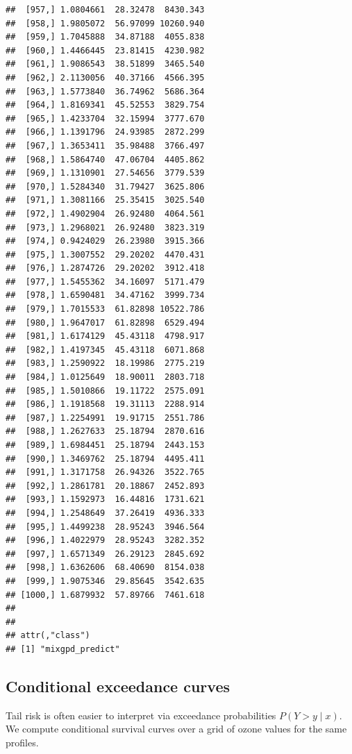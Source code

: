 \documentclass[article]{jss}\usepackage[]{graphicx}\usepackage[]{xcolor}
\makeatletter
\newenvironment{kframe}{%
 \def\at@end@of@kframe{}%
 \ifinner\ifhmode%
  \def\at@end@of@kframe{\end{minipage}}%
  \begin{minipage}{\columnwidth}%
 \fi\fi%
 \def\FrameCommand##1{\hskip\@totalleftmargin \hskip-\fboxsep
 \colorbox{shadecolor}{##1}\hskip-\fboxsep
     \hskip-\linewidth \hskip-\@totalleftmargin \hskip\columnwidth}%
 \MakeFramed {\advance\hsize-\width
   \@totalleftmargin\z@ \linewidth\hsize
   \@setminipage}}%
 {\par\unskip\endMakeFramed%
 \at@end@of@kframe}
\newenvironment{knitrout}{}{} %
\makeatother
\begin{document}
\begin{knitrout}
\begin{kframe}
\begin{verbatim}
##  [957,] 1.0804661  28.32478  8430.343
##  [958,] 1.9805072  56.97099 10260.940
##  [959,] 1.7045888  34.87188  4055.838
##  [960,] 1.4466445  23.81415  4230.982
##  [961,] 1.9086543  38.51899  3465.540
##  [962,] 2.1130056  40.37166  4566.395
##  [963,] 1.5773840  36.74962  5686.364
##  [964,] 1.8169341  45.52553  3829.754
##  [965,] 1.4233704  32.15994  3777.670
##  [966,] 1.1391796  24.93985  2872.299
##  [967,] 1.3653411  35.98488  3766.497
##  [968,] 1.5864740  47.06704  4405.862
##  [969,] 1.1310901  27.54656  3779.539
##  [970,] 1.5284340  31.79427  3625.806
##  [971,] 1.3081166  25.35415  3025.540
##  [972,] 1.4902904  26.92480  4064.561
##  [973,] 1.2968021  26.92480  3823.319
##  [974,] 0.9424029  26.23980  3915.366
##  [975,] 1.3007552  29.20202  4470.431
##  [976,] 1.2874726  29.20202  3912.418
##  [977,] 1.5455362  34.16097  5171.479
##  [978,] 1.6590481  34.47162  3999.734
##  [979,] 1.7015533  61.82898 10522.786
##  [980,] 1.9647017  61.82898  6529.494
##  [981,] 1.6174129  45.43118  4798.917
##  [982,] 1.4197345  45.43118  6071.868
##  [983,] 1.2590922  18.19986  2775.219
##  [984,] 1.0125649  18.90011  2803.718
##  [985,] 1.5010866  19.11722  2575.091
##  [986,] 1.1918568  19.31113  2288.914
##  [987,] 1.2254991  19.91715  2551.786
##  [988,] 1.2627633  25.18794  2870.616
##  [989,] 1.6984451  25.18794  2443.153
##  [990,] 1.3469762  25.18794  4495.411
##  [991,] 1.3171758  26.94326  3522.765
##  [992,] 1.2861781  20.18867  2452.893
##  [993,] 1.1592973  16.44816  1731.621
##  [994,] 1.2548649  37.26419  4936.333
##  [995,] 1.4499238  28.95243  3946.564
##  [996,] 1.4022979  28.95243  3282.352
##  [997,] 1.6571349  26.29123  2845.692
##  [998,] 1.6362606  68.40690  8154.038
##  [999,] 1.9075346  29.85645  3542.635
## [1000,] 1.6879932  57.89766  7461.618
## 
## 
## attr(,"class")
## [1] "mixgpd_predict"
\end{verbatim}
\end{kframe}
\end{knitrout}

\subsection{Conditional exceedance curves}

Tail risk is often easier to interpret via exceedance probabilities $P(Y>y \mid x)$.
We compute conditional survival curves over a grid of ozone values for the same profiles.
\end{document}
